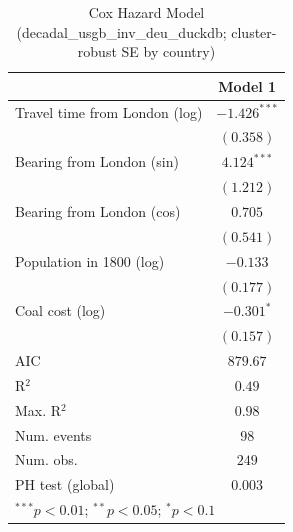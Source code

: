 
\begin{table}
\begin{center}
\begin{tabular}{l c}
\hline
 & Model 1 \\
\hline
Travel time from London (log) & $-1.426^{***}$ \\
 & $(0.358)$ \\
Bearing from London (sin) & $4.124^{***}$ \\
 & $(1.212)$ \\
Bearing from London (cos) & $0.705$ \\
 & $(0.541)$ \\
Population in 1800 (log) & $-0.133$ \\
 & $(0.177)$ \\
Coal cost (log) & $-0.301^{*}$ \\
 & $(0.157)$ \\
\hline
AIC              & $879.67$ \\
R$^2$            & $0.49$ \\
Max. R$^2$       & $0.98$ \\
Num. events      & $98$ \\
Num. obs.        & $249$ \\
PH test (global) & $0.003$ \\
\hline
\multicolumn{2}{l}{\scriptsize{$^{***}p<0.01$; $^{**}p<0.05$; $^{*}p<0.1$}}
\end{tabular}
\caption{Cox Hazard Model (decadal\_usgb\_inv\_deu\_duckdb; cluster-robust SE by country)}
\label{tab:cox_serious_decadal_usgb_inv_deu_duckdb}
\end{center}
\end{table}
